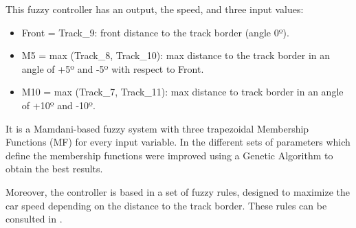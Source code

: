 \documentclass[conference]{IEEEtran}
\begin{document}
This fuzzy controller has an output, the speed, and three input values:
\begin{itemize}
	\item Front = Track\_9: front distance to the track border (angle 0º).  
	\item M5 = max (Track\_8, Track\_10): max distance to the track border in an angle of +5º and -5º with respect to Front.
	\item M10 = max (Track\_7, Track\_11): max distance to track border in an angle of +10º and -10º.
\end{itemize}

It is a Mamdani-based fuzzy system \cite{iancu2012} with three
trapezoidal Membership Functions (MF) for every input variable. 
In \cite{evo18} the different sets of parameters which define the membership functions were improved using a Genetic Algorithm to obtain the best results.



Moreover, the controller is based in a set of fuzzy rules, designed to maximize the car speed depending on the distance to the track border. These rules can be consulted in \cite{evo17}.
\end{document}
